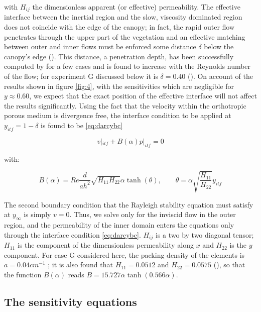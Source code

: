 with ${H}_{ij}$ the dimensionless apparent (or effective) permeability. The effective interface between the inertial region and the
slow, viscosity dominated region does not coincide with the edge of the canopy; in fact, the rapid
outer flow penetrates through the upper part of the vegetation and an effective matching between
outer and inner flows must be enforced some distance $\delta$ below the canopy’s edge (\citet{le2006interfacial}).  This distance,
a penetration depth, has been successfully computed by \citet{zampogna2016fluid} for a few cases
and is found to increase with the Reynolds number of the flow; for experiment G discussed below it
is $\delta = 0.40$ (\citet{zampognaprivate}). On account of the results shown in figure \ref{fig:4}, with the sensitivities which are negligible
for $y \approx 0.60$, we expect that the exact position of the effective interface will not affect the results
significantly.
Using the fact that the velocity within the orthotropic porous medium is divergence free, the
interface condition to be applied at $y_{itf} = 1 - \delta$ is found to be \eqref{eq:darcybc}

\begin{equation}
v|_{itf} + B(\alpha) p|_{itf} = 0
\label{eq:darcybc}
\end{equation}

with:

$$
B(\alpha) = Re \dfrac{d}{ah^2} \sqrt{{H}_{11} {H}_{22}} \alpha \tanh (\theta), \qquad \theta = \alpha \sqrt{\dfrac{{H}_{11}}{{H}_{22}}}  y_{itf}
$$

The second boundary condition that the Rayleigh stability equation must satisfy at $y_{\infty}$ is simply $v = 0$. Thus, we solve only for the inviscid flow in the outer region, and the permeability
of the inner domain enters the equations only through the interface condition \eqref{eq:darcybc}. ${H}_{ij}$ is a two by two diagonal tensor; ${H}_{11}$ is the component of the dimensionless permeability along $x$ and
${H}_{22}$ is the $y$ component. For case G considered here, the packing density of the elements is
$a = 0.04 cm^{-1}$ ; it is also found that ${H}_{11}= 0.0512$ and ${H}_{22} = 0.0575$ (\citet{zampognaprivate}),  so that the function $B(\alpha)$
reads $B = 15.727 \alpha \tanh (0.566 \alpha)$.


\subsection{The sensitivity equations}

